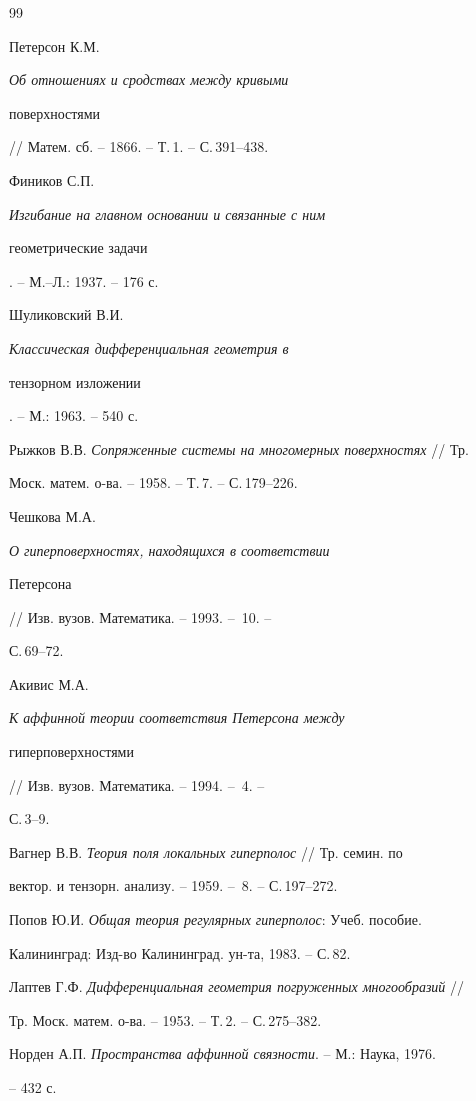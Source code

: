 \begin{thebibliography}{99} 


 




Петерсон К.М. {\em Об отношениях и сродствах между кривыми 


поверхностями} // Матем. сб. -- 1866. -- Т.\,1. -- С.\,391--438. 




Фиников С.П. {\em Изгибание на главном основании и связанные с ним 


геометрические задачи}. -- М.--Л.: 1937. -- 176 с. 




Шуликовский В.И. {\em Классическая дифференциальная геометрия в 


тензорном изложении}. -- М.: 1963. -- 540 с. 




Рыжков В.В. {\em Сопряженные системы на многомерных поверхностях} // Тр. 


Моск. матем. о-ва. -- 1958. -- Т.\,7. -- С.\,179--226. 




Чешкова М.А. {\em О гиперповерхностях, находящихся в соответствии 


Петерсона} // Изв. вузов. Математика. -- 1993. -- \No\,10. -- 


С.\,69--72. 




Акивис М.А. {\em К аффинной теории соответствия Петерсона между 


гиперповерхностями} // Изв. вузов. Математика. -- 1994. -- \No\,4. -- 


С.\,3--9. 




Вагнер В.В. {\em Теория поля локальных гиперполос} // Тр. семин. по 


вектор. и тензорн. анализу. -- 1959. -- \No\,8. -- С.\,197--272. 




Попов Ю.И. {\em Общая теория регулярных гиперполос}: Учеб. пособие. 


Калининград: Изд-во Калининград. ун-та, 1983. -- С.\,82. 




Лаптев Г.Ф. {\em Дифференциальная геометрия погруженных многообразий} // 


Тр. Моск. матем. о-ва. -- 1953. -- Т.\,2. -- С.\,275--382. 




Норден А.П. {\em Пространства аффинной связности}. -- М.: Наука, 1976. 


-- 432 с. 


 


\end{thebibliography} 


